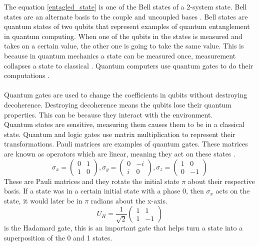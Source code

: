 \documentclass{Assignment}
\begin{document}
The equation \eqref{entagled_state} is one of the Bell states of a 2-system state.
Bell states are an alternate basis to the couple and uncoupled bases \cite{mcintyre_quantum_2012}.
Bell states are quantum states of two qubits that represent examples of quantum entanglement in quantum computing.
When one of the qubits in the states is measured and takes on a certain value, the other one is going to take the same value.
This is because in quantum mechanics a state can be measured once, measurement collapses a state to classical \cite{mcintyre_quantum_2012}.
Quantum computers use quantum gates to do their computations \cite{AndrewSteane}.
\\\\
Quantum gates are used to change the coefficients in qubits without destroying decoherence.
Destroying decoherence means the qubits lose their quantum properties.
This can be because they interact with the environment.\\
Quantum states are sensitive, measuring them causes them to be in a classical state.
Quantum and logic gates use matrix multiplication to represent their transformations.
Pauli matrices are examples of quantum gates.
These matrices are known as operators which are linear, meaning they act on these states \cite{AndrewSteane,mcintyre_quantum_2012}.
\begin{equation}
\sigma_x =\begin{pmatrix}
	0&1\\1&0
	\end{pmatrix},
	\sigma_y =\begin{pmatrix}
		0&-i\\i&0
	\end{pmatrix},\sigma_z =\begin{pmatrix}
	1&0\\0&-1
	\end{pmatrix}
\end{equation}
These are Pauli matrices and they rotate the initial state $\pi$ about their respective basis.
If a state was in a certain initial state with a phase 0, then $\sigma_x$ acts on the state, it would later be in $\pi$ radians about the x-axis.
\begin{equation}U_H=\frac{1}{\sqrt{2}}
	\begin{pmatrix}
		1&1\\1&-1
	\end{pmatrix}
\end{equation} is the Hadamard gate, this is an important gate that helps turn a state into a superposition of the 0 and 1 states.
\end{document}
